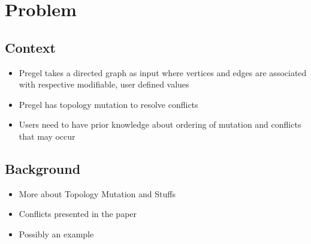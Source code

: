\section{Problem}
\subsection{Context}
\begin{frame}
\begin{itemize}
  \item Pregel takes a directed graph as input where vertices and edges are associated with respective modifiable, user defined values
  \item Pregel has topology mutation to resolve conflicts
  \item Users need to have prior knowledge about ordering of mutation and conflicts that may occur
\end{itemize}
\end{frame}

\subsection{Background}
\begin{frame}
\begin{itemize}
  \item More about Topology Mutation and Stuffs
  \item Conflicts presented in the paper
  \item Possibly an example
\end{itemize}
\end{frame}

